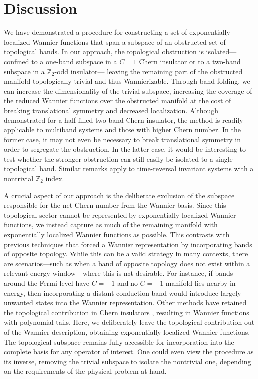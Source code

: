 \documentclass[galley,aps,pra,10pt,amsmath,amssymb,
    superscriptaddress,nofootinbib,longbibliography]{revtex4-2}
\begin{document}
\section{Discussion}

We have demonstrated a procedure for constructing a set of exponentially localized Wannier functions that span a subspace of an obstructed set of topological bands. In our approach, the topological obstruction is isolated—confined to a one-band subspace in a $C=1$ Chern insulator or to a two-band subspace in a $\mathbb{Z}_2$-odd insulator— leaving the remaining part of the obstructed manifold topologically trivial and thus Wannierizable. Through band folding, we can increase the dimensionality of the trivial subspace, increasing the coverage of the reduced Wannier functions over the obstructed manifold at the cost of breaking translational symmetry and decreased localization. Although demonstrated for a half-filled two-band Chern insulator, the method is readily applicable to multiband systems and those with higher Chern number. In the former case, it may not even be necessary to break translational symmetry in order to segregate the obstruction. In the latter case, it would be interesting to test whether the stronger obstruction can still easily be isolated to a single topological band. Similar remarks apply to time-reversal invariant systems with a nontrivial $\mathbb{Z}_2$ index.


A crucial aspect of our approach is the deliberate exclusion of the subspace responsible for the net Chern number from the Wannier basis. Since this topological sector cannot be represented by exponentially localized Wannier functions, we instead capture as much of the remaining manifold with exponentially localized Wannier functions as possible. This contrasts with previous techniques that forced a Wannier representation by incorporating bands of opposite topology. While this can be a valid strategy in many contexts, there are scenarios—such as when a band of opposite topology does not exist within a relevant energy window—where this is not desirable. For instance, if bands around the Fermi level have $C=-1$ and no $C=+1$ manifold lies nearby in energy, then incorporating a distant conduction band would introduce largely unwanted states into the Wannier representation. Other methods have retained the topological contribution in Chern insulators \cite{Gunawardana2024, li2024}, resulting in Wannier functions with polynomial tails. Here, we deliberately leave the topological contribution out of the Wannier description, obtaining exponentially localized Wannier functions. The topological subspace remains fully accessible for incorporation into the complete basis for any operator of interest. One could even view the procedure as its inverse, removing the trivial subspace to isolate the nontrivial one, depending on the requirements of the physical problem at hand.
\end{document}
